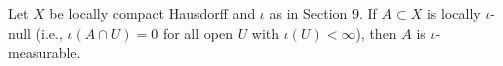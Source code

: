 Let $X$ be locally compact Hausdorff and $\iota$ as in Section 9. If $A \subset X$ is locally $\iota$-null (i.e., $\iota(A \cap U) = 0$ for all open $U$ with $\iota(U) < \infty$), then $A$ is $\iota$-measurable.